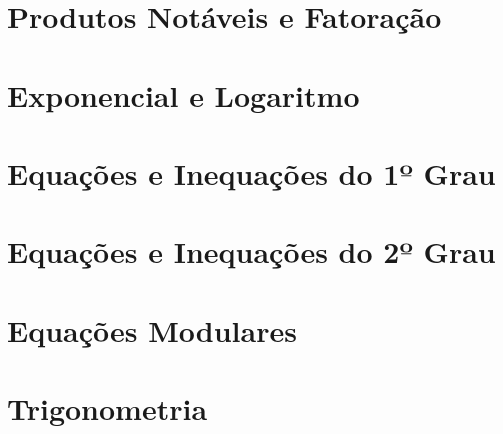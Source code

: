 \documentclass[a4paper,12pt]{book}
\begin{document}
		\chapter{Produtos Notáveis e Fatoração}
		
		
		\chapter{Exponencial e Logaritmo}
		
		
		\chapter{Equações e Inequações do 1º Grau}
		
		
		\chapter{Equações e Inequações do 2º Grau}
		
		
		\chapter{Equações Modulares}
		
		
		\chapter{Trigonometria}
		
		
	
\end{document}
